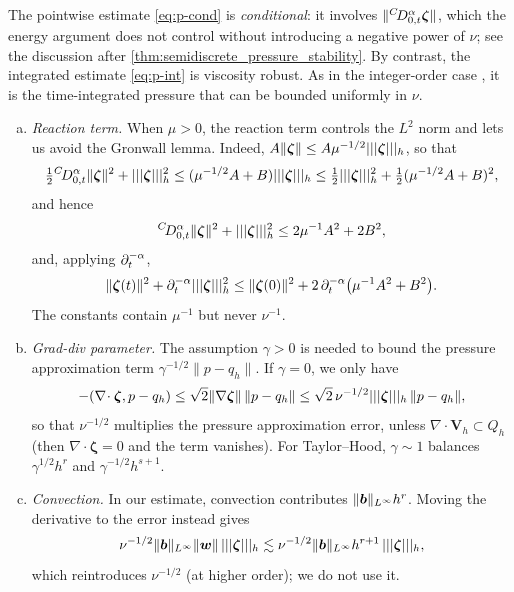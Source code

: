 The pointwise estimate \eqref{eq:p-cond} is \emph{conditional}: it involves $\|{}^{C}\!D_{0,t}^{\alpha}\bm\zeta\|$, which the energy argument does not control without introducing a negative power of $\nu$; see the discussion after \cref{thm:semidiscrete_pressure_stability}. By contrast, the integrated estimate \eqref{eq:p-int} is viscosity robust. As in the integer-order case \cite{BF07}, it is the time-integrated pressure that can be bounded uniformly in $\nu$.

\begin{remark}\label{rem:variants}
\begin{enumerate}[(a),leftmargin=2.4em]
\item \emph{Reaction term.} When $\mu>0$, the reaction term controls the $L^2$ norm and lets us avoid the Gronwall lemma. Indeed, $A\|\bm\zeta\|\le A\mu^{-1/2}|||\bm\zeta|||_h$, so that
\[
\tfrac12{}^{C}\!D_{0,t}^{\alpha}\|\bm\zeta\|^2+|||\bm\zeta|||_h^2\le(\mu^{-1/2}A+B)|||\bm\zeta|||_h\le\tfrac12|||\bm\zeta|||_h^2+\tfrac12(\mu^{-1/2}A+B)^2,
\]
and hence
\[
{}^{C}\!D_{0,t}^{\alpha}\|\bm\zeta\|^2+|||\bm\zeta|||_h^2\le2\mu^{-1}A^2+2B^2,
\]
and, applying $\partial_t^{-\alpha}$,
\[
\|\bm\zeta(t)\|^2+\partial_t^{-\alpha}|||\bm\zeta|||_h^2\le\|\bm\zeta(0)\|^2+2\,\partial_t^{-\alpha}\bigl(\mu^{-1}A^2+B^2\bigr).
\]
The constants contain $\mu^{-1}$ but never $\nu^{-1}$.
\item \emph{Grad-div parameter.} The assumption $\gamma>0$ is needed to bound the pressure approximation term $\gamma^{-1/2}\|p-q_h\|$. If $\gamma=0$, we only have
\[
-(\nabla\!\cdot\bm\zeta,p-q_h)\le\sqrt2\|\nabla\bm\zeta\|\,\|p-q_h\|\le\sqrt2\,\nu^{-1/2}|||\bm\zeta|||_h\,\|p-q_h\|,
\]
so that $\nu^{-1/2}$ multiplies the pressure approximation error, unless $\nabla\!\cdot\bm V_h\subset Q_h$ (then $\nabla\!\cdot\bm\zeta=0$ and the term vanishes). For Taylor--Hood, $\gamma\sim1$ balances $\gamma^{1/2}h^r$ and $\gamma^{-1/2}h^{s+1}$.
\item \emph{Convection.} In our estimate, convection contributes $\|\boldsymbol b\|_{L^\infty}h^r$. Moving the derivative to the error instead gives
\[
\nu^{-1/2}\|\boldsymbol b\|_{L^\infty}\|\bm w\|\,|||\bm\zeta|||_h\lesssim\nu^{-1/2}\|\boldsymbol b\|_{L^\infty}h^{r+1}\,|||\bm\zeta|||_h,
\]
which reintroduces $\nu^{-1/2}$ (at higher order); we do not use it.
\end{enumerate}
\end{remark}